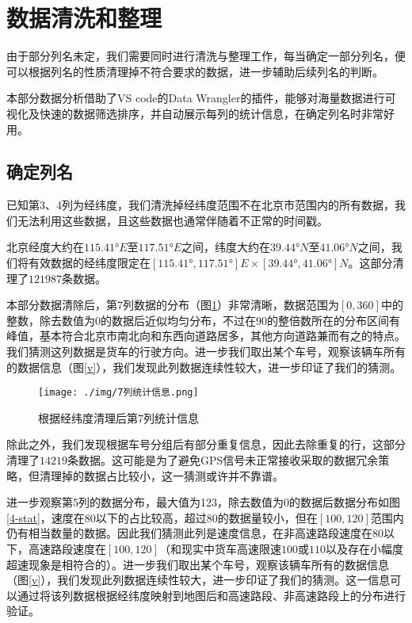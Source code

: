 \documentclass[UTF8]{ctexart}
\begin{document}
\section{数据清洗和整理}

由于部分列名未定，我们需要同时进行清洗与整理工作，每当确定一部分列名，便可以根据列名的性质清理掉不符合要求的数据，进一步辅助后续列名的判断。

本部分数据分析借助了VS code的Data Wrangler的插件，能够对海量数据进行可视化及快速的数据筛选排序，并自动展示每列的统计信息，在确定列名时非常好用。

\subsection{确定列名}

已知第3、4列为经纬度，我们清洗掉经纬度范围不在北京市范围内的所有数据，我们无法利用这些数据，且这些数据也通常伴随着不正常的时间戳。

北京经度大约在$115.41°E$至$117.51°E$之间，纬度大约在$39.44°N$至$41.06°N$之间，我们将有效数据的经纬度限定在$[115.41°,117.51°]E\times [39.44°, 41.06°]N$。这部分清理了$121987$条数据。

本部分数据清除后，第7列数据的分布（图\ref{7-stat}）非常清晰，数据范围为$[0,360]$中的整数，除去数值为$0$的数据后近似均匀分布，不过在$90$的整倍数所在的分布区间有峰值，基本符合北京市南北向和东西向道路居多，其他方向道路兼而有之的特点。我们猜测这列数据是货车的行驶方向。进一步我们取出某个车号，观察该辆车所有的数据信息（图\ref{v}），我们发现此列数据连续性较大，进一步印证了我们的猜测。

\begin{figure}[!htb]
    \centering
    \texttt{[image: ./img/7列统计信息.png]}
    \caption{根据经纬度清理后第7列统计信息}
    \label{7-stat}
\end{figure}

除此之外，我们发现根据车号分组后有部分重复信息，因此去除重复的行，这部分清理了$14219$条数据。这可能是为了避免GPS信号未正常接收采取的数据冗余策略，但清理掉的数据占比较小，这一猜测或许并不靠谱。

进一步观察第5列的数据分布，最大值为123，除去数值为$0$的数据后数据分布如图\ref{4-stat}，速度在80以下的占比较高，超过80的数据量较小，但在$[100,120]$范围内仍有相当数量的数据。因此我们猜测此列是速度信息，在非高速路段速度在$80$以下，高速路段速度在$[100,120]$（和现实中货车高速限速$100$或$110$以及存在小幅度超速现象是相符合的）。进一步我们取出某个车号，观察该辆车所有的数据信息（图\ref{v}），我们发现此列数据连续性较大，进一步印证了我们的猜测。这一信息可以通过将该列数据根据经纬度映射到地图后和高速路段、非高速路段上的分布进行验证。
\end{document}

